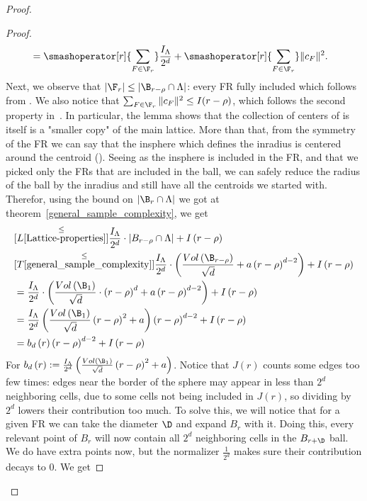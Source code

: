 \begin{proof}
\begin{proof}
\begin{align*}
        &=\smashoperator[r]{\sum_{F\in \F_r}}\frac{I_\Lambda}{2^d} + \smashoperator[r]{\sum_{F\in \F_r}}\|c_F\|^2. %
    \end{align*}
   Next, we observe that $|\F_r|\leq |\B_{r-\rho}\cap \Lambda|$: every FR fully included  which  follows from . We also notice that $\sum_{F\in \F_r}\|c_F\|^2\leq I(r-\rho)$, which follows the second property in~. In particular,  the lemma shows that the collection of centers of is itself is a "smaller copy" of the main lattice. More than that, from the symmetry of the FR we can say that the insphere which defines the inradius is centered around the centroid (). Seeing as the insphere is included in the FR, and that we picked only the FRs that are included in the ball, we can safely reduce the radius of the ball by the inradius and still have all the centroids we started with. Therefor, using the bound on $|\B_r\cap\Lambda|$ we got at theorem~\ref{general_sample_complexity}, we get
    \begin{align}
        &\overset{\leq}{[L\ref{Lattice-properties}]} \frac{I_\Lambda}{2^d}\cdot|B_{r-\rho}\cap\Lambda| + I\left(r-\rho\right) \nonumber\\
        &\overset{\leq}{[T\ref{general_sample_complexity}]} \frac{I_\Lambda}{2^d}\cdot\left(\frac{Vol\left(\B_{r-\rho}\right)}{\sqrt{d}}+a\left(r-\rho\right)^{d-2}\right) + I\left(r-\rho\right) \nonumber\\
        &=\frac{I_\Lambda}{2^d}\cdot\left(\frac{Vol\left(\B_1\right)}{\sqrt{d}}\cdot \left(r-\rho\right)^d+a\left(r-\rho\right)^{d-2}\right) + I\left(r-\rho\right)\nonumber\\
        &=\frac{I_\Lambda}{2^d}\left(\frac{Vol\left(\B_1\right)}{\sqrt{d}}\left(r-\rho\right)^2 + a\right)\left(r-\rho\right)^{d-2} + I\left(r-\rho\right) \nonumber\\
        &=b_d\left(r\right)\left(r-\rho\right)^{d-2} + I\left(r-\rho\right)
    \end{align}
    For $b_d\left(r\right):=\frac{I_\Lambda}{2^d}\left(\frac{Vol\left(\B_1\right)}{\sqrt{d}}\left(r-\rho\right)^2 + a\right)$. Notice that $J\left(r\right)$ counts some edges too few times: edges near the border of the sphere may appear in less than $2^d$ neighboring cells, due to some cells not being included in $J\left(r\right)$, so dividing by $2^d$ lowers their contribution too much. To solve this, we will notice that for a given FR we can take the diameter $\D$ and expand $B_r$ with it. Doing this, every relevant point of $B_r$ will now contain all $2^d$ neighboring cells in the $B_{r+\D}$ ball. We do have extra points now, but the normalizer $\frac{1}{2^d}$ makes sure their contribution decays to 0. We get

\end{proof}
\end{proof}
